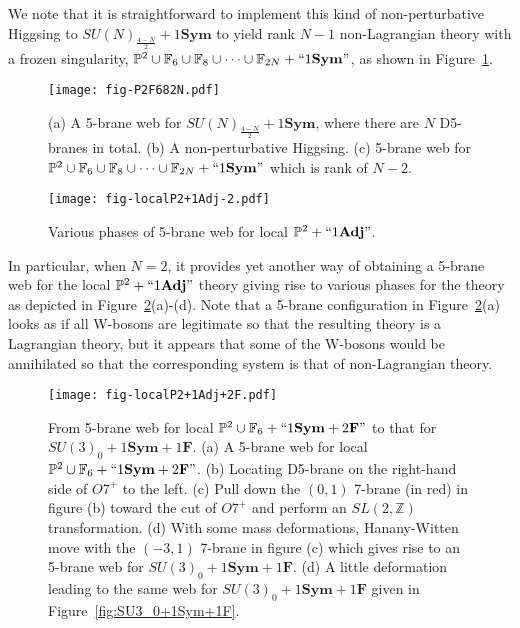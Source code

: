 We note that it is straightforward to implement this kind of non-perturbative Higgsing to $SU(N)_\frac{4-N}{2}+1\mathbf{Sym}$ to yield rank $N-1$ non-Lagrangian theory with a frozen singularity, $\mathbb{P}^2\cup \mathbb{F}_6 \cup \mathbb{F}_8 \cup \cdots \cup \mathbb{F}_{2N}+``1\mathbf{Sym}"$, as shown in Figure~\ref{fig:P2F682N}.
\begin{figure}[t]
\texttt{[image: fig-P2F682N.pdf]}
\centering	
\caption{(a) A 5-brane web for $SU(N)_\frac{4-N}{2}+1\mathbf{Sym}$, where there are $N$ D5-branes in total. (b) A non-perturbative Higgsing. (c) 5-brane web for $\mathbb{P}^2\cup \mathbb{F}_6 \cup \mathbb{F}_8 \cup \cdots \cup \mathbb{F}_{2N}+``1\mathbf{Sym}"$ which is rank of $N-2$.}
\label{fig:P2F682N}
\end{figure}
\begin{figure}[t]
\texttt{[image: fig-localP2+1Adj-2.pdf]}
\centering	
\caption{Various phases of 5-brane web for local $\mathbb{P}^2 +``1\mathbf{Adj}"$.}
\label{fig:localP2+1Adj-2}
\end{figure}
In particular, when $N=2$, it provides yet another way of obtaining a 5-brane web for the local $\mathbb{P}^2+``1\mathbf{Adj}"$ theory giving rise to various phases for the theory as depicted in Figure~\ref{fig:localP2+1Adj-2}(a)-(d). Note that a 5-brane configuration in Figure~\ref{fig:localP2+1Adj-2}(a) looks as if all W-bosons are legitimate so that the resulting theory is a Lagrangian theory, but it appears that some of the W-bosons would be annihilated so that the corresponding system is that of non-Lagrangian theory. \medskip \bigskip

\begin{figure}[t]
	\texttt{[image: fig-localP2+1Adj+2F.pdf]}
	\centering	
	\caption{From 5-brane web for local $\mathbb{P}^2 \cup \mathbb{F}_6+``1\mathbf{Sym}+2\mathbf{F}"$ to that for $SU(3)_0 +1\mathbf{Sym}+1\mathbf{F}$. (a) A 5-brane web for local $\mathbb{P}^2 \cup \mathbb{F}_6+``1\mathbf{Sym}+2\mathbf{F}"$. (b) Locating D5-brane on the right-hand side of $O7^+$ to the left. (c) Pull down the $(0,1)$ 7-brane (in red) in figure (b) toward the cut of $O7^+$ and perform an $SL(2,\mathbb{Z})$ transformation. (d) With some mass deformations, Hanany-Witten move with the $(-3, 1)$ 7-brane in figure (c) which gives rise to an 5-brane web for $SU(3)_0 +1\mathbf{Sym}+1\mathbf{F}$. (d) A little deformation leading to the same web for $SU(3)_0 +1\mathbf{Sym}+1\mathbf{F}$ given in Figure~\ref{fig:SU3_0+1Sym+1F}.}
	\label{fig:localP2+1Adj+2F}
\end{figure}

